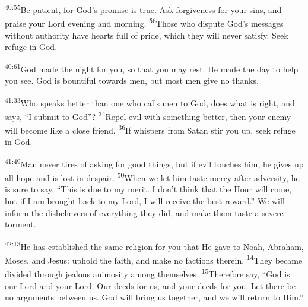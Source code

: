 \documentclass[openany,12pt,english]{book}
\newenvironment{para}{\par\pretolerance=100\tolerance=200\setlength{\emergencystretch}{0.6em}\relax}{\par}
\begin{document}
\bigskip{}

\begin{para}
    \textsuperscript{40:55}\thinspace{}Be pa\-tient, for God's prom\-ise is true. Ask for\-give\-ness for your sins, and praise your Lord eve\-ning and morn\-ing.
    \textsuperscript{56}\thinspace{}Those who dis\-pute God's messages with\-out au\-thor\-i\-ty have hearts full of pride, which they will nev\-er sat\-is\-fy. Seek ref\-uge in God.
\end{para}

\begin{para}
    \textsuperscript{40:61}\thinspace{}God made the night for you, so that you may rest. He made the day to help you see. God is boun\-ti\-ful to\-wards men, but most men give no thanks.
\end{para}

\bigskip{}

\begin{para}
    \textsuperscript{41:33}\thinspace{}Who speaks bet\-ter than one who calls men to God, does what is right, and says, “I sub\-mit to God”?
    \textsuperscript{34}\thinspace{}Re\-pel evil with some\-thing bet\-ter, then your en\-e\-my will be\-come like a close friend.
    \textsuperscript{36}\thinspace{}If whispers from Satan stir you up, seek ref\-uge in God.
\end{para}

\begin{para}
    \textsuperscript{41:49}\thinspace{}Man nev\-er tires of asking for good things, but if evil touches him, he gives up all hope and is lost in des\-pair.
    \textsuperscript{50}\thinspace{}When we let him taste mer\-cy af\-ter ad\-ver\-si\-ty, he is sure to say, “This is due to my mer\-it. I don't think that the Hour will come, but if I am brought back to my Lord, I will re\-ceive the best re\-ward.” We will in\-form the disbelievers of eve\-ry\-thing they did, and make them taste a se\-vere tor\-ment.
\end{para}

\bigskip{}

\begin{para}
    \textsuperscript{42:13}\thinspace{}He has established the same re\-li\-gion for you that He gave to No\-ah, Abraham, Mo\-ses, and Jesus: up\-hold the faith, and make no factions there\-in.
    \textsuperscript{14}\thinspace{}They be\-came di\-vid\-ed through jeal\-ous an\-i\-mos\-i\-ty a\-mong them\-selves.
    \textsuperscript{15}\thinspace{}There\-fore say, “God is our Lord and your Lord. Our deeds for us, and your deeds for you. Let there be no arguments be\-tween us. God will bring us to\-geth\-er, and we will re\-turn to Him.”
\end{para}
\end{document}
